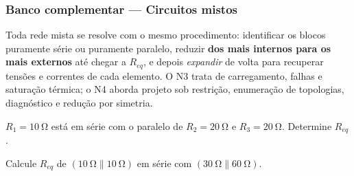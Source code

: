 
\subsubsection*{Banco complementar --- Circuitos mistos}

\begin{atencao}
Toda rede mista se resolve com o mesmo procedimento: identificar os blocos
puramente série ou puramente paralelo, reduzir \textbf{dos mais internos para
os mais externos} até chegar a $R_{eq}$, e depois \emph{expandir} de volta para
recuperar tensões e correntes de cada elemento. O N3 trata de carregamento,
falhas e saturação térmica; o N4 aborda projeto sob restrição, enumeração de
topologias, diagnóstico e redução por simetria.
\end{atencao}

\blocofixacao

\begin{questao}[1]{}
$R_1=\SI{10}{\ohm}$ está em série com o paralelo de $R_2=\SI{20}{\ohm}$ e
$R_3=\SI{20}{\ohm}$. Determine $R_{eq}$.
\end{questao}

\begin{questao}[1]{}
Calcule $R_{eq}$ de $(\SI{10}{\ohm}\parallel\SI{10}{\ohm})$ em série com
$(\SI{30}{\ohm}\parallel\SI{60}{\ohm})$.
\end{questao}

